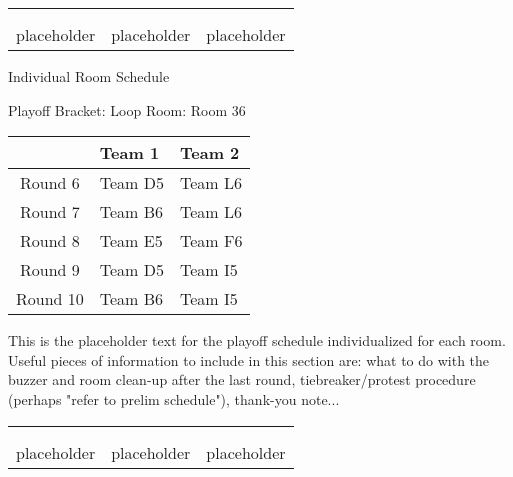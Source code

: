 \documentclass{article}%
\begin{document}
%
\begin{tabularx}{\textwidth}{YYY}%
  &  &  \\%
\\%
placeholder&placeholder&placeholder\\%
\end{tabularx}%
\newpage%
\begin{center}%
\begin{Huge}%
Individual Room Schedule%
\end{Huge}%
\vspace*{16pt}%
\linebreak%
\begin{Large}%
Playoff Bracket: Loop \hfill Room: Room 36%
\end{Large}%
\end{center}%
%
\begin{tabularx}{\textwidth}{|c|Y|Y|}%
\hline%
&Team 1&Team 2\\%
\hline%
Round 6&Team D5&Team L6\\%
Round 7&Team B6&Team L6\\%
Round 8&Team E5&Team F6\\%
Round 9&Team D5&Team I5\\%
Round 10&Team B6&Team I5\\%
\hline%
\end{tabularx}%
\vspace*{16pt}%
\linebreak%
This is the placeholder text for the playoff schedule individualized for each room. Useful pieces of information to include in this section are: what to do with the buzzer and room clean{-}up after the last round, tiebreaker/protest procedure (perhaps "refer to prelim schedule"), thank{-}you note...%
\vspace*{30pt}%
\newline%
%
\begin{tabularx}{\textwidth}{YYY}%
  &  &  \\%
\\%
placeholder&placeholder&placeholder\\%
\end{tabularx}%
\newpage%
\end{document}
